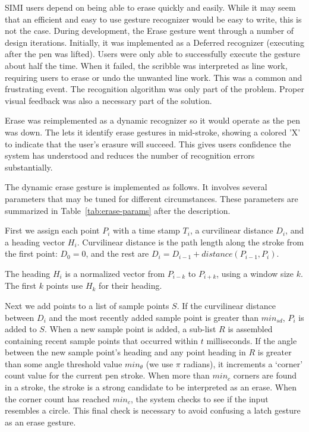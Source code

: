 


SIMI users depend on being able to erase quickly and easily. While it
may seem that an efficient and easy to use gesture recognizer would be
easy to write, this is not the case. During development, the Erase
gesture went through a number of design iterations. Initially, it was
implemented as a Deferred recognizer (executing after the pen was
lifted). Users were only able to successfully execute the gesture
about half the time. When it failed, the scribble was interpreted as
line work, requiring users to erase or undo the unwanted line work. This
was a common and frustrating event. The recognition algorithm was only
part of the problem. Proper visual feedback was also a necessary part
of the solution.

Erase was reimplemented as a dynamic recognizer so it would operate as
the pen was down. The lets it identify erase gestures in mid-stroke,
showing a colored 'X' to indicate that the user's erasure will
succeed. This gives users confidence the system has understood and
reduces the number of recognition errors substantially.

The dynamic erase gesture is implemented as follows. It involves
several parameters that may be tuned for different
circumstances. These parameters are summarized in
Table~\ref{tab:erase-params} after the description.

First we assign each point $P_i$ with a time stamp $T_i$, a
curvilinear distance $D_i$, and a heading vector $H_i$. Curvilinear
distance is the path length along the stroke from the first point:
$D_0=0$, and the rest are $D_i = D_{i-1} + distance(P_{i-1}, P_i)$.

The heading $H_i$ is a normalized vector from $P_{i-k}$ to $P_{i+k}$,
using a window size $k$. The first $k$ points use $H_k$ for their
heading.

Next we add points to a list of sample points $S$. If the curvilinear
distance between $D_i$ and the most recently added sample point is
greater than $min_{sd}$, $P_i$ is added to $S$. When a new sample
point is added, a sub-list $R$ is assembled containing recent sample
points that occurred within $t$ milliseconds. If the angle between the
new sample point's heading and any point heading in $R$ is greater
than some angle threshold value $min_\theta$ (we use $\pi$ radians),
it increments a `corner' count value for the current pen stroke. When
more than $min_c$ corners are found in a stroke, the stroke is a
strong candidate to be interpreted as an erase. When the corner count
has reached $min_c$, the system checks to see if the input resembles a
circle. This final check is necessary to avoid confusing a latch
gesture as an erase gesture. 

